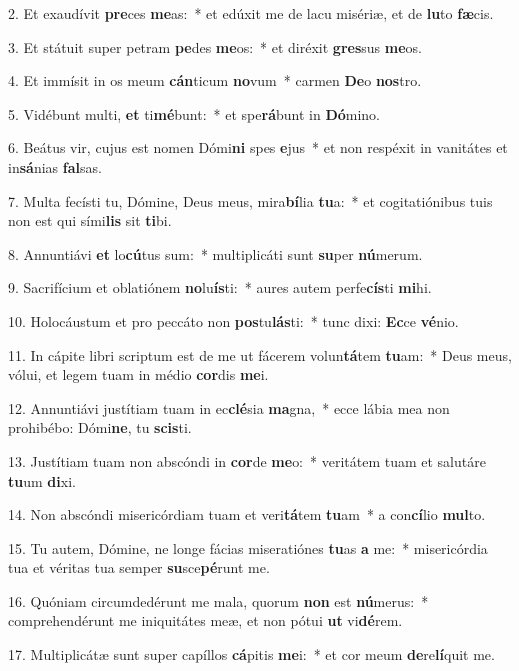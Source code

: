 2. Et exaudívit \textbf{pre}ces \textbf{me}as:~*  et edúxit me de lacu misériæ, et de \textbf{lu}to \textbf{fæ}cis.\

3. Et státuit super petram \textbf{pe}des \textbf{me}os:~*  et diréxit \textbf{gres}sus \textbf{me}os.\

4. Et immísit in os meum \textbf{cán}ticum \textbf{no}vum~*  carmen \textbf{De}o \textbf{nos}tro.\

5. Vidébunt multi, \textbf{et} ti\textbf{mé}bunt:~*  et spe\textbf{rá}bunt in \textbf{Dó}mino.\

6. Beátus vir, cujus est nomen Dómi\textbf{ni} spes \textbf{e}jus~*  et non respéxit in vanitátes et in\textbf{sá}nias \textbf{fal}sas.\

7. Multa fecísti tu, Dómine, Deus meus, mira\textbf{bí}lia \textbf{tu}a:~*  et cogitatiónibus tuis non est qui sími\textbf{lis} sit \textbf{ti}bi.\

8. Annuntiávi \textbf{et} lo\textbf{cú}tus sum:~*  multiplicáti sunt \textbf{su}per \textbf{nú}merum.\

9. Sacrifícium et oblatiónem \textbf{no}lu\textbf{ís}ti:~*  aures autem perfe\textbf{cís}ti \textbf{mi}hi.\

10. Holocáustum et pro peccáto non \textbf{pos}tu\textbf{lás}ti:~*  tunc dixi: \textbf{Ec}ce \textbf{vé}nio.\

11. In cápite libri scriptum est de me ut fácerem volun\textbf{tá}tem \textbf{tu}am:~*  Deus meus, vólui, et legem tuam in médio \textbf{cor}dis \textbf{me}i.\

12. Annuntiávi justítiam tuam in ec\textbf{clé}sia \textbf{ma}gna,~*  ecce lábia mea non prohibébo: Dómi\textbf{ne}, tu \textbf{scis}ti.\

13. Justítiam tuam non abscóndi in \textbf{cor}de \textbf{me}o:~*  veritátem tuam et salutáre \textbf{tu}um \textbf{di}xi.\

14. Non abscóndi misericórdiam tuam et veri\textbf{tá}tem \textbf{tu}am~*  a con\textbf{cí}lio \textbf{mul}to.\

15. Tu autem, Dómine, ne longe fácias miseratiónes \textbf{tu}as \textbf{a} me:~*  misericórdia tua et véritas tua semper \textbf{su}sce\textbf{pé}runt me.\

16. Quóniam circumdedérunt me mala, quorum \textbf{non} est \textbf{nú}merus:~*  comprehendérunt me iniquitátes meæ, et non pótui \textbf{ut} vi\textbf{dé}rem.\

17. Multiplicátæ sunt super capíllos \textbf{cá}pitis \textbf{me}i:~*  et cor meum \textbf{de}re\textbf{lí}quit me.\


